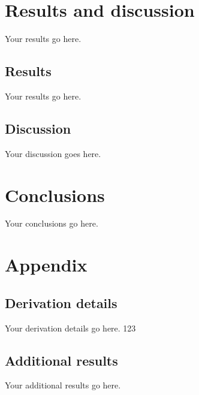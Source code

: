 \documentclass{paper}
\begin{document}
\section{Results and discussion}
\label{sec:results}

Your results go here.

\subsection{Results}
\label{subsec:results}

Your results go here.

\subsection{Discussion}
\label{subsec:discussion}

Your discussion goes here.

\section{Conclusions}
\label{sec:conclusions}

Your conclusions go here.

\appendix
\section{Appendix}
\label{sec:appendix}

\subsection{Derivation details}
\label{sec:derivation_details}

Your derivation details go here. 123

\subsection{Additional results}
\label{sec:additional_results}

Your additional results go here.



\end{document}
